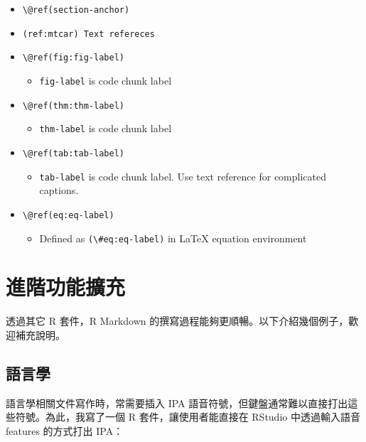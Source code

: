\documentclass[oneside]{book}
\providecommand{\tightlist}{%
  \setlength{\itemsep}{0pt}\setlength{\parskip}{0pt}}
\theoremstyle{definition}
\theoremstyle{definition}
\theoremstyle{definition}
\theoremstyle{remark}
\begin{document}
\begin{itemize}
\tightlist
\item
  \texttt{\textbackslash{}@ref(section-anchor)}
\item
  \texttt{(ref:mtcar)\ Text\ refereces}
\item
  \texttt{\textbackslash{}@ref(fig:fig-label)}

  \begin{itemize}
  \tightlist
  \item
    \texttt{fig-label} is code chunk label
  \end{itemize}
\item
  \texttt{\textbackslash{}@ref(thm:thm-label)}

  \begin{itemize}
  \tightlist
  \item
    \texttt{thm-label} is code chunk label
  \end{itemize}
\item
  \texttt{\textbackslash{}@ref(tab:tab-label)}

  \begin{itemize}
  \tightlist
  \item
    \texttt{tab-label} is code chunk label. Use text reference for
    complicated captions.
  \end{itemize}
\item
  \texttt{\textbackslash{}@ref(eq:eq-label)}

  \begin{itemize}
  \tightlist
  \item
    Defined as \texttt{(\textbackslash{}\#eq:eq-label)} in LaTeX
    equation environment
  \end{itemize}
\end{itemize}

\chapter{進階功能擴充}\label{add-on}

透過其它 R 套件，R Markdown
的撰寫過程能夠更順暢。以下介紹幾個例子，歡迎補充說明。

\section{語言學}\label{ling}

語言學相關文件寫作時，常需要插入 IPA
語音符號，但鍵盤通常難以直接打出這些符號。為此，我寫了一個 R
套件，讓使用者能直接在 RStudio 中透過輸入語音 features 的方式打出 IPA：
\end{document}
